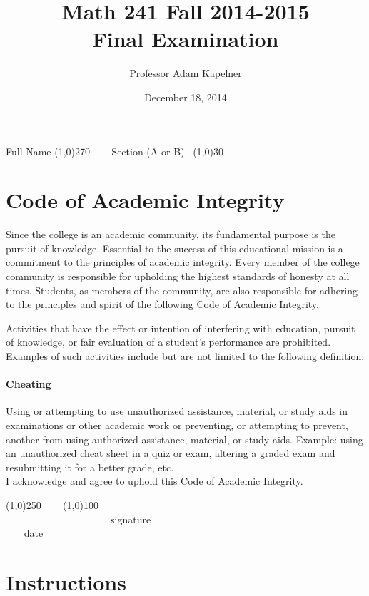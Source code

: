 \documentclass[12pt]{article}
\title{Math 241 Fall 2014-2015 \\ Final Examination}
\author{Professor Adam Kapelner}
\date{December 18, 2014}
\begin{document}
\maketitle

\noindent Full Name \line(1,0){270} ~~~ Section (A or B)~ \line(1,0){30}

\thispagestyle{empty}

\section*{Code of Academic Integrity}

\footnotesize
Since the college is an academic community, its fundamental purpose is the pursuit of knowledge. Essential to the success of this educational mission is a commitment to the principles of academic integrity. Every member of the college community is responsible for upholding the highest standards of honesty at all times. Students, as members of the community, are also responsible for adhering to the principles and spirit of the following Code of Academic Integrity.

Activities that have the effect or intention of interfering with education, pursuit of knowledge, or fair evaluation of a student's performance are prohibited. Examples of such activities include but are not limited to the following definition:

\paragraph{Cheating} Using or attempting to use unauthorized assistance, material, or study aids in examinations or other academic work or preventing, or attempting to prevent, another from using authorized assistance, material, or study aids. Example: using an unauthorized cheat sheet in a quiz or exam, altering a graded exam and resubmitting it for a better grade, etc.
\\

\noindent I acknowledge and agree to uphold this Code of Academic Integrity. \\

\begin{center}
\line(1,0){250} ~~~ \line(1,0){100}\\
~~~~~~~~~~~~~~~~~~~~~signature~~~~~~~~~~~~~~~~~~~~~~~~~~~~~~~~~~~~~~~~~~~~~ date
\end{center}

\normalsize

\section*{Instructions}
\end{document}
